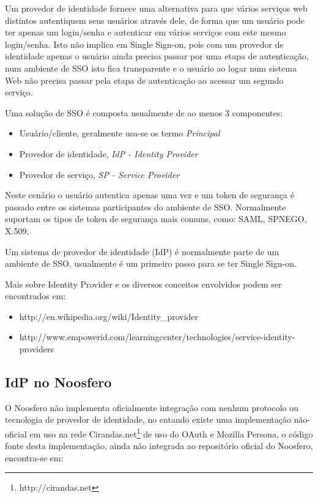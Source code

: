 \documentclass[11pt]{article}
\begin{document}
Um provedor de identidade fornece uma alternativa para que vários serviços web
distintos autentiquem seus usuários através dele, de forma que um usuário pode
ter apenas um login/senha e autenticar em vários serviços com este mesmo
login/senha. Isto não implica em Single Sign-on, pois com um provedor de
identidade apenas o usuário ainda precisa passar por uma etapa de
autenticação, num ambiente de SSO isto fica transparente e o usuário ao logar
num sistema Web não precisa passar pela etapa de autenticação ao acessar um
segundo serviço.

Uma solução de SSO é composta usualmente de ao menos 3 componentes:

\begin{itemize}
  \item{Usuário/cliente, geralmente usa-se os termo {\it Principal}}
  \item{Provedor de identidade, {\it IdP - Identity Provider}}
  \item{Provedor de serviço, {\it SP - Service Provider}}
\end{itemize}

Neste cenário o usuário autentica apenas uma vez e um token de segurança é
passado entre os sistemas participantes do ambiente de SSO. Normalmente
suportam os tipos de token de segurança mais comuns, como: SAML, SPNEGO,
X.509.

Um sistema de provedor de identidade (IdP) é normalmente parte de um ambiente
de SSO, usualmente é um primeiro passo para se ter Single Sign-on.

Mais sobre Identity Provider e os diversos conceitos envolvidos podem ser
encontrados em:
\begin{itemize}
  \item{http://en.wikipedia.org/wiki/Identity\_provider}
  \item{http://www.empowerid.com/learningcenter/technologies/service-identity-providers}
\end{itemize}

\subsection{IdP no Noosfero}

O Noosfero não implementa oficialmente integração com nenhum protocolo ou
tecnologia de provedor de identidade, no entando existe uma implementação
não-oficial em uso na rede Cirandas.net\footnote{http://cirandas.net} de uso
do OAuth e Mozilla Persona, o código fonte desta implementação, ainda não
integrada ao repositório oficial do Noosfero, encontra-se em:
\end{document}
